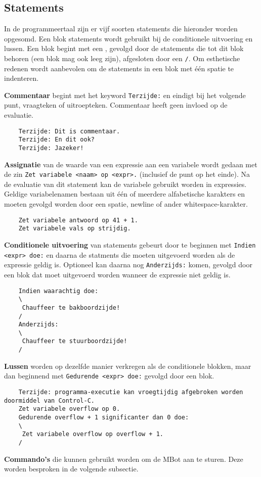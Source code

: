 \documentclass[11pt]{article}
\begin{document}
\subsection{Statements}
In de programmeertaal zijn er vijf soorten statements die hieronder worden opgesomd. Een blok statements wordt gebruikt bij de conditionele uitvoering en lussen. Een blok begint met een \texttt{}, gevolgd door de statements die tot dit blok behoren (een blok mag ook leeg zijn), afgesloten door een \texttt{/}. Om esthetische redenen wordt aanbevolen om de statements in een blok met één spatie te indenteren.
\begin{description}
    \item{\bf Commentaar} begint met het keyword \texttt{Terzijde:} en eindigt bij het volgende punt, vraagteken of uitroepteken. Commentaar heeft geen invloed op de evaluatie.
    \begin{lstlisting}
    Terzijde: Dit is commentaar.
    Terzijde: En dit ook?
    Terzijde: Jazeker!\end{lstlisting}

    \item{\bf Assignatie} van de waarde van een expressie aan een variabele wordt gedaan met de zin \texttt{Zet variabele <naam> op <expr>.} (inclusief de punt op het einde). Na de evaluatie van dit statement kan de variabele gebruikt worden in expressies. Geldige variabelenamen bestaan uit één of meerdere alfabetische karakters en moeten gevolgd worden door een spatie, newline of ander whitespace-karakter.
    \begin{lstlisting}
    Zet variabele antwoord op 41 + 1.
    Zet variabele vals op strijdig.\end{lstlisting}

\item{\bf Conditionele uitvoering} van statements gebeurt door te beginnen met \texttt{Indien <expr> doe:} en daarna de statments die moeten uitgevoerd worden als de expressie geldig is. Optioneel kan daarna nog \texttt{Anderzijds:} komen, gevolgd door een blok dat moet uitgevoerd worden wanneer de expressie niet geldig is.
    \begin{lstlisting}
    Indien waarachtig doe:
    \
     Chauffeer te bakboordzijde!
    /
    Anderzijds:
    \
     Chauffeer te stuurboordzijde!
    /\end{lstlisting}
    \item{\bf Lussen} worden op dezelfde manier verkregen als de conditionele blokken, maar dan beginnend met \texttt{Gedurende <expr> doe:} gevolgd door een blok.
    \begin{lstlisting}
    Terzijde: programma-executie kan vroegtijdig afgebroken worden doormiddel van Control-C.
    Zet variabele overflow op 0.
    Gedurende overflow + 1 significanter dan 0 doe:
    \
     Zet variabele overflow op overflow + 1.
    /\end{lstlisting}
    \item{\bf Commando's} die kunnen gebruikt worden om de MBot aan te sturen. Deze worden besproken in de volgende subsectie.
\end{description}
\end{document}
